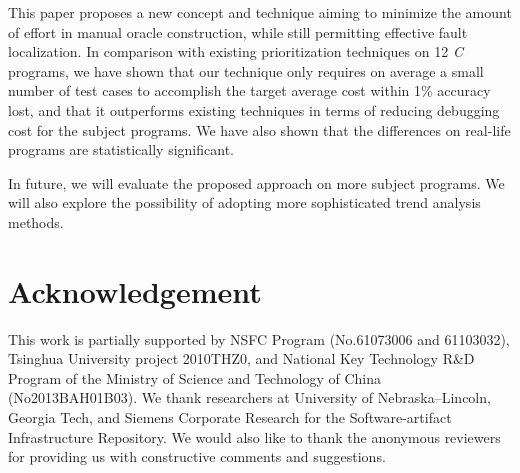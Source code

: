 This paper proposes a new concept and technique aiming to minimize the amount of effort in manual oracle construction, while still permitting effective fault localization. In comparison with existing prioritization techniques on 12 {\em C} programs, we have shown that our technique only requires on average a small number of test cases to accomplish the target average cost within 1\% accuracy lost, and that it outperforms existing techniques in terms of reducing debugging cost for the subject programs. We have also shown that the differences on real-life programs are statistically significant.

In future, we will evaluate the proposed approach on more subject programs. We will also explore the possibility of adopting more sophisticated trend analysis methods.


\section{Acknowledgement} \label{sec.acknowledgement}
This work is partially supported by NSFC Program (No.61073006 and 61103032), Tsinghua University project 2010THZ0, and National Key Technology R\&D Program of the Ministry of Science and Technology of China (No2013BAH01B03). We thank researchers at University of Nebraska--Lincoln, Georgia Tech, and Siemens Corporate Research for the Software-artifact Infrastructure Repository. We would also like to thank the anonymous reviewers for providing us with constructive comments and suggestions.
